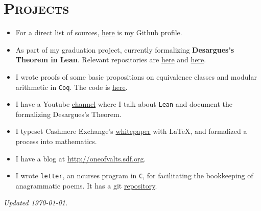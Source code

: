 \documentclass[oneside, 11pt]{memoir}
\begin{document}
\section*{\textsc{Projects}}
\begin{itemize}[leftmargin=*]
  \item For a direct list of sources,
    \href{https://github.com/oneofvalts}{here} is my Github profile.
  \item As part of my graduation project, currently formalizing
    \textbf{Desargues's Theorem in Lean}. Relevant repositories are
    \href{https://github.com/oneofvalts/desargues-doc}{here} and
    \href{https://github.com/oneofvalts/desargues}{here}.
  \item I wrote proofs of some basic propositions on equivalence classes
    and modular arithmetic in \texttt{Coq}. The code is
    \href{https://github.com/oneofvalts/equivalence-classes}{here}.
  \item I have a Youtube
    \href{https://www.youtube.com/@veryarticulateloudthinker}{channel}
    where I talk about \texttt{Lean} and document the formalizing
    Desargues's Theorem.
  \item I typeset Cashmere Exchange's
    \href{https://docsend.com/view/ryp2wmfc5yxaabep}{whitepaper} with
    \LaTeX, and formalized a process into mathematics.
  \item I have a blog at \url{http://oneofvalts.sdf.org}.
  \item I wrote \texttt{letter}, an ncurses program in \texttt{C}, for
  facilitating the bookkeeping of anagrammatic poems. It has a git
  \href{https://github.com/oneofvalts/letter}{repository}.
\end{itemize}
\vfill\hfill{}\tiny\textit{Updated \today.}
\end{document}
